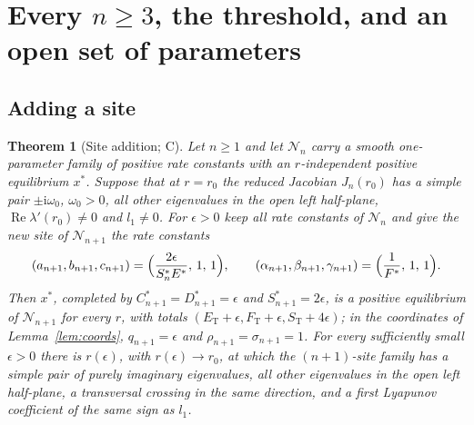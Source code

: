 \documentclass[11pt,a4paper]{article}
\theoremstyle{plain}
\newtheorem{theorem}{Theorem}[section]
\theoremstyle{definition}
\theoremstyle{remark}
\newcommand{\ii}{\mathrm i}
\newcommand{\cN}{\mathcal N}
\newcommand{\ET}{E_{\mathrm T}}
\newcommand{\FT}{F_{\mathrm T}}
\newcommand{\ST}{S_{\mathrm T}}
\DeclareMathOperator{\Ree}{Re}
\newcommand{\evC}{\textsf{C}}
\begin{document}
\section{Every \texorpdfstring{$n\ge3$}{n >= 3}, the threshold, and an open set of parameters}\label{sec:alln}

\subsection{Adding a site}
\begin{theorem}[Site addition; \evC]\label{thm:alln}
Let $n\ge1$ and let $\cN_n$ carry a smooth one-parameter family of positive rate constants with an $r$-independent positive equilibrium $x^*$. Suppose that at $r=r_0$ the reduced Jacobian $J_n(r_0)$ has a simple pair $\pm\ii\omega_0$, $\omega_0>0$, all other eigenvalues in the open left half-plane, $\Ree\lambda'(r_0)\ne0$ and $l_1\ne0$. For $\epsilon>0$ keep all rate constants of $\cN_n$ and give the new site of $\cN_{n+1}$ the rate constants
\begin{equation}\label{eq:newrates}
 (a_{n+1},b_{n+1},c_{n+1})=\Bigl(\frac{2\epsilon}{S_n^*E^*},\,1,\,1\Bigr),\qquad
 (\alpha_{n+1},\beta_{n+1},\gamma_{n+1})=\Bigl(\frac1{F^*},\,1,\,1\Bigr).
\end{equation}
Then $x^*$, completed by $C_{n+1}^*=D_{n+1}^*=\epsilon$ and $S_{n+1}^*=2\epsilon$, is a positive equilibrium of $\cN_{n+1}$ for every $r$, with totals $(\ET+\epsilon,\FT+\epsilon,\ST+4\epsilon)$; in the coordinates of Lemma~\ref{lem:coords}, $q_{n+1}=\epsilon$ and $\rho_{n+1}=\sigma_{n+1}=1$. For every sufficiently small $\epsilon>0$ there is $r(\epsilon)$, with $r(\epsilon)\to r_0$, at which the $(n+1)$-site family has a simple pair of purely imaginary eigenvalues, all other eigenvalues in the open left half-plane, a transversal crossing in the same direction, and a first Lyapunov coefficient of the same sign as $l_1$.
\end{theorem}
\end{document}
